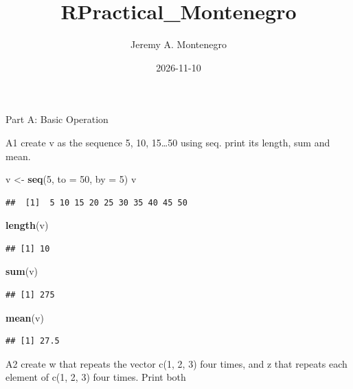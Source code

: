 \documentclass[
]{article}
\title{RPractical\_Montenegro}
\author{Jeremy A. Montenegro}
\date{2026-11-10}
\newenvironment{Shaded}{\begin{snugshade}}{\end{snugshade}}
\newcommand{\AttributeTok}[1]{\textcolor[rgb]{0.13,0.29,0.53}{#1}}
\newcommand{\DecValTok}[1]{\textcolor[rgb]{0.00,0.00,0.81}{#1}}
\newcommand{\FunctionTok}[1]{\textcolor[rgb]{0.13,0.29,0.53}{\textbf{#1}}}
\newcommand{\NormalTok}[1]{#1}
\newcommand{\OtherTok}[1]{\textcolor[rgb]{0.56,0.35,0.01}{#1}}
\begin{document}
\maketitle

Part A: Basic Operation

A1 create v as the sequence 5, 10, 15\ldots50 using seq. print its
length, sum and mean.

\begin{Shaded}
\begin{Highlighting}[]
\NormalTok{v }\OtherTok{\textless{}{-}} \FunctionTok{seq}\NormalTok{(}\DecValTok{5}\NormalTok{, }\AttributeTok{to =} \DecValTok{50}\NormalTok{, }\AttributeTok{by =} \DecValTok{5}\NormalTok{)}
\NormalTok{v}
\end{Highlighting}
\end{Shaded}

\begin{verbatim}
##  [1]  5 10 15 20 25 30 35 40 45 50
\end{verbatim}

\begin{Shaded}
\begin{Highlighting}[]
\FunctionTok{length}\NormalTok{(v)}
\end{Highlighting}
\end{Shaded}

\begin{verbatim}
## [1] 10
\end{verbatim}

\begin{Shaded}
\begin{Highlighting}[]
\FunctionTok{sum}\NormalTok{(v)}
\end{Highlighting}
\end{Shaded}

\begin{verbatim}
## [1] 275
\end{verbatim}

\begin{Shaded}
\begin{Highlighting}[]
\FunctionTok{mean}\NormalTok{(v)}
\end{Highlighting}
\end{Shaded}

\begin{verbatim}
## [1] 27.5
\end{verbatim}

A2 create w that repeats the vector c(1, 2, 3) four times, and z that
repeats each element of c(1, 2, 3) four times. Print both
\end{document}
